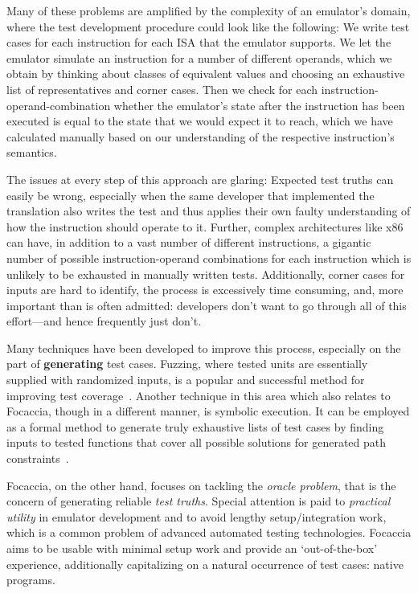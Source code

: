 Many of these problems are amplified by the complexity of an emulator's domain, where the test development procedure
could look like the following: We write test cases for each instruction for each ISA that the emulator supports. We let
the emulator simulate an instruction for a number of different operands, which we obtain by thinking about classes of
equivalent values and choosing an exhaustive list of representatives and corner cases. Then we check for each
instruction-operand-combination whether the emulator's state after the instruction has been executed is equal to the
state that we would expect it to reach, which we have calculated manually based on our understanding of the respective
instruction's semantics.

The issues at every step of this approach are glaring: Expected test truths can easily be wrong, especially when the
same developer that implemented the translation also writes the test and thus applies their own faulty understanding of
how the instruction should operate to it. Further, complex architectures like x86 can have, in addition to a vast number
of different instructions, a gigantic number of possible instruction-operand combinations for each instruction which is
unlikely to be exhausted in manually written tests. Additionally, corner cases for inputs are hard to identify, the
process is excessively time consuming, and, more important than is often admitted: developers don't want to go through
all of this effort---and hence frequently just don't.

Many techniques have been developed to improve this process, especially on the part of \textbf{generating} test cases.
Fuzzing, where tested units are essentially supplied with randomized inputs, is a popular and successful method for
improving test coverage~\cite{Zhu+2022Fuzzing}. Another technique in this area which also relates to Focaccia, though in
a different manner, is symbolic execution. It can be employed as a formal method to generate truly exhaustive lists of
test cases by finding inputs to tested functions that cover all possible solutions for generated path
constraints~\cite{Li2011SymbexecTestGeneration}.

Focaccia, on the other hand, focuses on tackling the \textit{oracle problem}, that is the concern of generating reliable
\textit{test truths}. Special attention is paid to \textit{practical utility} in emulator development and to avoid
lengthy setup/integration work, which is a common problem of advanced automated testing technologies. Focaccia aims to
be usable with minimal setup work and provide an `out-of-the-box' experience, additionally capitalizing on a natural
occurrence of test cases: native programs.

